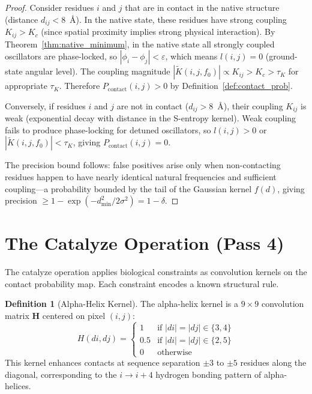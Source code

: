 \documentclass[11pt,twocolumn,a4paper]{article}
\theoremstyle{definition}
\newtheorem{definition}[theorem]{Definition}
\theoremstyle{remark}
\newcommand{\Ktilde}{\tilde{K}}
\newcommand{\phaselk}{\varepsilon}
\begin{document}
\begin{proof}
Consider residues $i$ and $j$ that are in contact in the native structure (distance $d_{ij} < 8$~\AA). In the native state, these residues have strong coupling $K_{ij} > K_c$ (since spatial proximity implies strong physical interaction). By Theorem~\ref{thm:native_minimum}, in the native state all strongly coupled oscillators are phase-locked, so $|\phi_i - \phi_j| < \phaselk$, which means $l(i,j) = 0$ (ground-state angular level). The coupling magnitude $|\Ktilde(i,j,f_0)| \propto K_{ij} > K_c > \tau_K$ for appropriate $\tau_K$. Therefore $P_{\text{contact}}(i,j) > 0$ by Definition~\ref{def:contact_prob}.

Conversely, if residues $i$ and $j$ are not in contact ($d_{ij} > 8$~\AA), their coupling $K_{ij}$ is weak (exponential decay with distance in the S-entropy kernel). Weak coupling fails to produce phase-locking for detuned oscillators, so $l(i,j) > 0$ or $|\Ktilde(i,j,f_0)| < \tau_K$, giving $P_{\text{contact}}(i,j) = 0$.

The precision bound follows: false positives arise only when non-contacting residues happen to have nearly identical natural frequencies and sufficient coupling---a probability bounded by the tail of the Gaussian kernel $f(d)$, giving precision $\geq 1 - \exp(-d_{\min}^2 / 2\sigma^2) = 1 - \delta$.
\end{proof}

\section{The Catalyze Operation (Pass 4)}
\label{sec:catalyze}

The catalyze operation applies biological constraints as convolution kernels on the contact probability map. Each constraint encodes a known structural rule.

\begin{definition}[Alpha-Helix Kernel]
\label{def:helix_kernel}
The alpha-helix kernel is a $9 \times 9$ convolution matrix $\mathbf{H}$ centered on pixel $(i, j)$:
\begin{equation}
H(di, dj) = \begin{cases}
1 & \text{if } |di| = |dj| \in \{3, 4\} \\
0.5 & \text{if } |di| = |dj| \in \{2, 5\} \\
0 & \text{otherwise}
\end{cases}
\end{equation}
This kernel enhances contacts at sequence separation $\pm 3$ to $\pm 5$ residues along the diagonal, corresponding to the $i \to i+4$ hydrogen bonding pattern of alpha-helices.
\end{definition}
\end{document}
